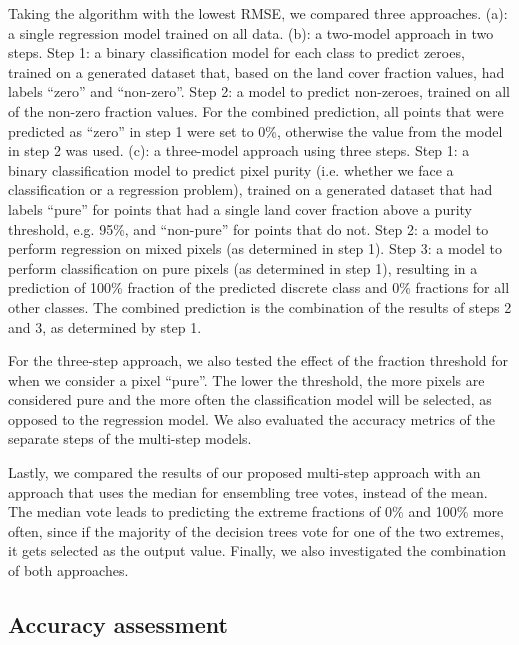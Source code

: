 \documentclass[review,authoryear,3p]{elsarticle}
\begin{document}
Taking the algorithm with the lowest \gls{RMSE}, we compared three approaches.
(a): a single regression model trained on all data.
(b): a two-model approach in two steps.
Step 1: a binary classification model for each class to predict zeroes, trained on a generated dataset that, based on the land cover fraction values, had labels ``zero'' and ``non-zero''.
Step 2: a model to predict non-zeroes, trained on all of the non-zero fraction values.
For the combined prediction, all points that were predicted as ``zero'' in step 1 were set to 0\%, otherwise the value from the model in step 2 was used.
(c): a three-model approach using three steps.
Step 1: a binary classification model to predict pixel purity (i.e. whether we face a classification or a regression problem), trained on a generated dataset that had labels ``pure'' for points that had a single land cover fraction above a purity threshold, e.g. 95\%, and ``non-pure'' for points that do not.
Step 2: a model to perform regression on mixed pixels (as determined in step 1).
Step 3: a model to perform classification on pure pixels (as determined in step 1), resulting in a prediction of 100\% fraction of the predicted discrete class and 0\% fractions for all other classes.
The combined prediction is the combination of the results of steps 2 and 3, as determined by step 1.

For the three-step approach, we also tested the effect of the fraction threshold for when we consider a pixel ``pure''.
The lower the threshold, the more pixels are considered pure and the more often the classification model will be selected, as opposed to the regression model.
We also evaluated the accuracy metrics of the separate steps of the multi-step models.

Lastly, we compared the results of our proposed multi-step approach with an approach that uses the median for ensembling tree votes, instead of the mean.
The median vote leads to predicting the extreme fractions of 0\% and 100\% more often, since if the majority of the decision trees vote for one of the two extremes, it gets selected as the output value.
Finally, we also investigated the combination of both approaches.

\subsection{Accuracy assessment}
\end{document}
